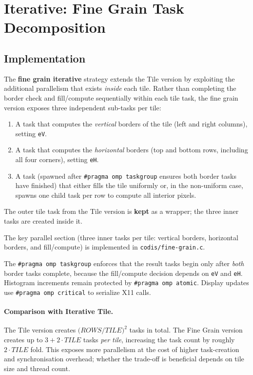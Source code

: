 \section{Iterative: Fine Grain Task Decomposition}
\label{sec:iter-fine}

\subsection{Implementation}
\label{sec:iter-fine-impl}

The \textbf{fine grain iterative} strategy extends the Tile version by exploiting the
additional parallelism that exists \emph{inside} each tile.
Rather than completing the border check and fill/compute sequentially within each tile
task, the fine grain version exposes three independent sub-tasks per tile:

\begin{enumerate}
    \item A task that computes the \emph{vertical} borders of the tile (left and right
          columns), setting \texttt{eV}.
    \item A task that computes the \emph{horizontal} borders (top and bottom rows,
          including all four corners), setting \texttt{eH}.
    \item A task (spawned after \texttt{\#pragma~omp~taskgroup} ensures both border tasks
          have finished) that either fills the tile uniformly or, in the non-uniform case,
          spawns one child task per row to compute all interior pixels.
\end{enumerate}

The outer tile task from the Tile version is \textbf{kept} as a wrapper; the three inner
tasks are created inside it.

The key parallel section (three inner tasks per tile: vertical borders, horizontal borders, and fill/compute) is implemented in \texttt{codis/fine-grain.c}.

The \texttt{\#pragma~omp~taskgroup} enforces that the result tasks begin only after
\emph{both} border tasks complete, because the fill/compute decision depends on
\texttt{eV} and \texttt{eH}.
Histogram increments remain protected by \texttt{\#pragma omp atomic}.
Display updates use \texttt{\#pragma omp critical} to serialize X11 calls.

\paragraph{Comparison with Iterative Tile.}
The Tile version creates $\bigl(\mathit{ROWS}/\mathit{TILE}\bigr)^{2}$ tasks in total.
The Fine Grain version creates up to $3 + 2\cdot\mathit{TILE}$ tasks \emph{per tile},
increasing the task count by roughly $2\cdot\mathit{TILE}$ fold.
This exposes more parallelism at the cost of higher task-creation and synchronisation
overhead; whether the trade-off is beneficial depends on tile size and thread count.

